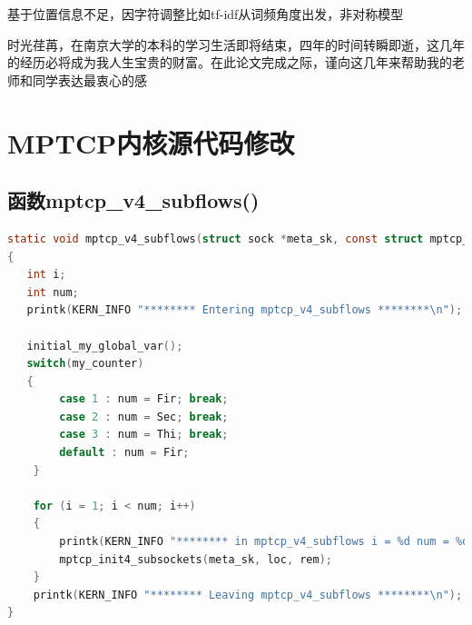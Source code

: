 \documentclass[winfonts,master,oneside,nobackinfo]{njuthesis}
\begin{document}
基于位置信息不足，因字符调整比如tf-idf从词频角度出发，非对称模型




\begin{acknowledgement}
时光荏苒，在南京大学的本科的学习生活即将结束，四年的时间转瞬即逝，这几年的经历必将成为我人生宝贵的财富。在此论文完成之际，谨向这几年来帮助我的老师和同学表达最衷心的感

\end{acknowledgement}








\appendix
\chapter{MPTCP内核源代码修改}\label{app:1}
\section{函数mptcp\_v4\_subflows()}
\begin{lstlisting}[language=C]
static void mptcp_v4_subflows(struct sock *meta_sk, const struct mptcp_loc4 *loc, struct mptcp_rem4 *rem)
{
   int i;
   int num;
   printk(KERN_INFO "******** Entering mptcp_v4_subflows ********\n");

   initial_my_global_var();
   switch(my_counter)
   {
		case 1 : num = Fir; break;
		case 2 : num = Sec; break;
		case 3 : num = Thi; break;
		default : num = Fir;
	}

	for (i = 1; i < num; i++)
	{
		printk(KERN_INFO "******** in mptcp_v4_subflows i = %d num = %d********\n",i,num);
		mptcp_init4_subsockets(meta_sk, loc, rem);
	}
	printk(KERN_INFO "******** Leaving mptcp_v4_subflows ********\n");
}
\end{lstlisting}
\end{document}
